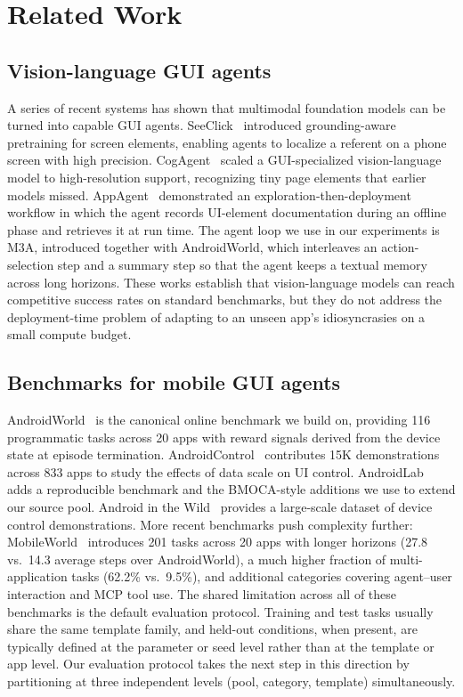 \section{Related Work}
\label{sec:related}

\subsection{Vision-language GUI agents}

A series of recent systems has shown that multimodal foundation models can be turned into capable GUI agents. SeeClick~\citep{cheng2024seeclick} introduced grounding-aware pretraining for screen elements, enabling agents to localize a referent on a phone screen with high precision. CogAgent~\citep{hong2024cogagent} scaled a GUI-specialized vision-language model to high-resolution support, recognizing tiny page elements that earlier models missed. AppAgent~\citep{yang2023appagent} demonstrated an exploration-then-deployment workflow in which the agent records UI-element documentation during an offline phase and retrieves it at run time. The agent loop we use in our experiments is M3A, introduced together with AndroidWorld, which interleaves an action-selection step and a summary step so that the agent keeps a textual memory across long horizons. These works establish that vision-language models can reach competitive success rates on standard benchmarks, but they do not address the deployment-time problem of adapting to an unseen app's idiosyncrasies on a small compute budget.

\subsection{Benchmarks for mobile GUI agents}

AndroidWorld~\citep{rawles2024androidworld} is the canonical online benchmark we build on, providing 116 programmatic tasks across 20 apps with reward signals derived from the device state at episode termination. AndroidControl~\citep{li2024androidcontrol} contributes 15K demonstrations across 833 apps to study the effects of data scale on UI control. AndroidLab~\citep{xu2024androidlab} adds a reproducible benchmark and the BMOCA-style additions we use to extend our source pool. Android in the Wild~\citep{rawles2023aitw} provides a large-scale dataset of device control demonstrations. More recent benchmarks push complexity further: MobileWorld~\citep{mobileworld2025} introduces 201 tasks across 20 apps with longer horizons (27.8 vs.\ 14.3 average steps over AndroidWorld), a much higher fraction of multi-application tasks (62.2\% vs.\ 9.5\%), and additional categories covering agent--user interaction and MCP tool use. The shared limitation across all of these benchmarks is the default evaluation protocol. Training and test tasks usually share the same template family, and held-out conditions, when present, are typically defined at the parameter or seed level rather than at the template or app level. Our evaluation protocol takes the next step in this direction by partitioning at three independent levels (pool, category, template) simultaneously.

